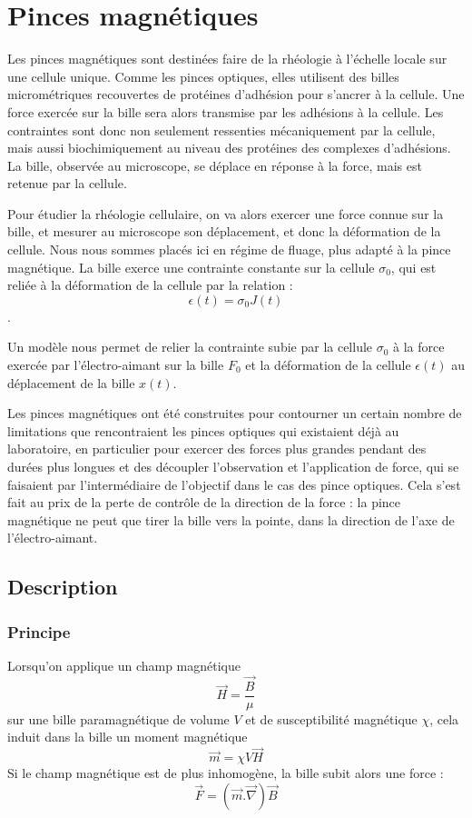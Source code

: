 \section{Pinces magnétiques}

Les pinces magnétiques sont destinées faire de la rhéologie à l'échelle locale sur une cellule unique. Comme les pinces optiques, elles utilisent des billes micrométriques recouvertes de protéines d'adhésion pour s'ancrer à la cellule. 
Une force exercée sur la bille sera alors transmise par les adhésions à la cellule.
 Les contraintes sont donc non seulement ressenties mécaniquement par la cellule, mais aussi biochimiquement au niveau des protéines des complexes d'adhésions. 
La bille, observée au microscope, se déplace en réponse à la force, mais est retenue par la cellule.

Pour étudier la rhéologie cellulaire, on va alors exercer une force connue sur la bille, et mesurer au microscope son déplacement, et donc la déformation de la cellule.
Nous nous sommes placés ici en régime de fluage, plus adapté à la pince magnétique. La bille exerce une contrainte constante sur la cellule $\sigma_0$, qui est reliée à la déformation de la cellule par la relation : 
$$\epsilon (t) = \sigma_0 J(t)$$.

Un modèle nous permet de relier la contrainte subie par la cellule $\sigma_0$ à la force exercée par l'électro-aimant sur la bille $F_0$ et la déformation de la cellule $\epsilon (t)$ au déplacement de la bille $x(t)$. 






Les pinces magnétiques ont été construites pour contourner un certain nombre de limitations que rencontraient les pinces optiques qui existaient déjà au laboratoire, en particulier pour exercer des forces plus grandes pendant des durées plus longues et des découpler l'observation et l'application de force, qui se faisaient par l'intermédiaire de l'objectif dans le cas des pince optiques. Cela s'est fait au prix de la perte de contrôle de la direction de la force : la pince magnétique ne peut que tirer la bille vers la pointe, dans la direction de l'axe de l'électro-aimant. 


	\subsection{Description}
		\subsubsection{Principe}
		Lorsqu'on applique un champ magnétique $$\vec{H} = \frac{\vec{B}}{\mu}$$ sur une bille paramagnétique de volume $V$ et de susceptibilité magnétique $\chi$, cela induit dans la bille un moment magnétique $$\vec{m} = \chi V \vec{H}$$ Si le champ magnétique est de plus inhomogène, la bille subit alors une force :$$\vec{F} = \left( \vec{m}. \vec{\nabla} \right) \vec{B}$$
	
